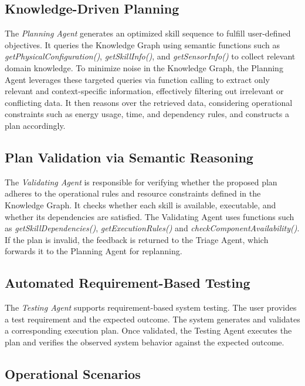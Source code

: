 \begin{bibunit}
    \subsection{Knowledge-Driven Planning}
    
    The \textit{Planning Agent} generates an optimized skill sequence to fulfill user-defined objectives. It queries the Knowledge Graph using semantic functions such as \textit{getPhysicalConfiguration()}, \textit{getSkillInfo()}, and \textit{getSensorInfo()} to collect relevant domain knowledge. To minimize noise in the Knowledge Graph, the Planning Agent leverages these targeted queries via function calling to extract only relevant and context-specific information, effectively filtering out irrelevant or conflicting data. It then reasons over the retrieved data, considering operational constraints such as energy usage, time, and dependency rules, and constructs a plan accordingly.
    
    
    \subsection{Plan Validation via Semantic Reasoning}
    
    The \textit{Validating Agent} is responsible for verifying whether the proposed plan adheres to the operational rules and resource constraints defined in the Knowledge Graph. It checks whether each skill is available, executable, and whether its dependencies are satisfied. The Validating Agent uses functions such as \textit{getSkillDependencies()},  \textit{ getExecutionRules()} and \textit{checkComponentAvailability()}. If the plan is invalid, the feedback is returned to the Triage Agent, which forwards it to the Planning Agent for replanning.
    
    \subsection{Automated Requirement-Based Testing}
    
    The \textit{Testing Agent} supports requirement-based system testing. The user provides a test requirement and the expected outcome. The system generates and validates a corresponding execution plan. Once validated, the Testing Agent executes the plan and verifies the observed system behavior against the expected outcome.
    
    \subsection{Operational Scenarios}
    

\end{bibunit}
